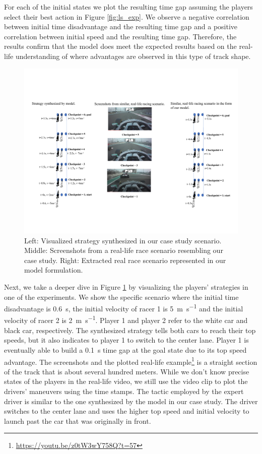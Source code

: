 For each of the initial states we plot the resulting time gap assuming the players select their best action in Figure \ref{fig:ls_exp}. We observe a negative correlation between initial time disadvantage and the resulting time gap and a positive correlation between initial speed and the resulting time gap. Therefore, the results confirm that the model does meet the expected results based on the real-life understanding of where advantages are observed in this type of track shape. 
\begin{figure}
\includegraphics[height=0.8\textwidth, width=\textheight]{Figures/StraightViz.pdf}
    \caption[Synthesized strategy compared to real-life scenario on a long straight.] { Left: Visualized strategy synthesized in our case study scenario. Middle: Screenshots from a real-life race scenario resembling our case study.  Right: Extracted real race scenario represented in our model formulation.}
    \label{fig:ls}
\end{figure}
Next, we take a deeper dive in Figure \ref{fig:ls} by visualizing the players' strategies in one of the experiments. We show the specific scenario where the initial time disadvantage is \SI{0.6}{\second}, the initial velocity of racer 1 is \SI{5}{\meter\per\second} and the initial velocity of racer 2 is \SI{2}{\meter\per\second}. Player 1 and player 2 refer to the white car and black car, respectively. The synthesized strategy tells both cars to reach their top speeds, but it also indicates to player 1 to switch to the center lane. Player 1 is eventually able to build a \SI{0.1}{\second} time gap at the goal state due to its top speed advantage. The screenshots and the plotted real-life example\footnote{\label{straightnote}\url{https://youtu.be/z0tW3wY758Q?t=57}} is a straight section of the track that is about several hundred meters. While we don't know precise states of the players in the real-life video, we still use the video clip to plot the drivers' maneuvers using the time stamps. The tactic employed by the expert driver is similar to the one synthesized by the model in our case study. The driver switches to the center lane and uses the higher top speed and initial velocity to launch past the car that was originally in front. 


